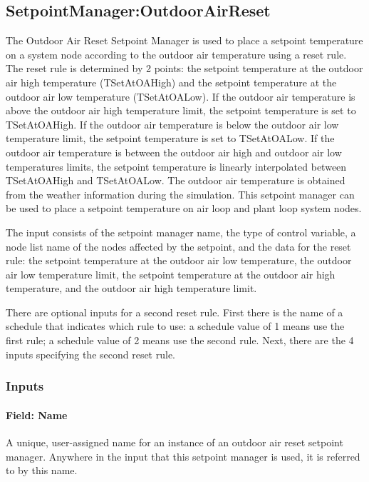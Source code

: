 \subsection{SetpointManager:OutdoorAirReset}\label{setpointmanageroutdoorairreset}

The Outdoor Air Reset Setpoint Manager is used to place a setpoint temperature on a system node according to the outdoor air temperature using a reset rule. The reset rule is determined by 2 points: the setpoint temperature at the outdoor air high temperature (TSetAtOAHigh) and the setpoint temperature at the outdoor air low temperature (TSetAtOALow). If the outdoor air temperature is above the outdoor air high temperature limit, the setpoint temperature is set to TSetAtOAHigh. If the outdoor air temperature is below the outdoor air low temperature limit, the setpoint temperature is set to TSetAtOALow. If the outdoor air temperature is between the outdoor air high and outdoor air low temperatures limits, the setpoint temperature is linearly interpolated between TSetAtOAHigh and TSetAtOALow. The outdoor air temperature is obtained from the weather information during the simulation. This setpoint manager can be used to place a setpoint temperature on air loop and plant loop system nodes.

The input consists of the setpoint manager name, the type of control variable, a node list name of the nodes affected by the setpoint, and the data for the reset rule: the setpoint temperature at the outdoor air low temperature, the outdoor air low temperature limit, the setpoint temperature at the outdoor air high temperature, and the outdoor air high temperature limit.

There are optional inputs for a second reset rule. First there is the name of a schedule that indicates which rule to use: a schedule value of 1 means use the first rule; a schedule value of 2 means use the second rule. Next, there are the 4 inputs specifying the second reset rule.

\subsubsection{Inputs}\label{inputs-2-037}

\paragraph{Field: Name}\label{field-name-2-035}

A unique, user-assigned name for an instance of an outdoor air reset setpoint manager. Anywhere in the input that this setpoint manager is used, it is referred to by this name.

